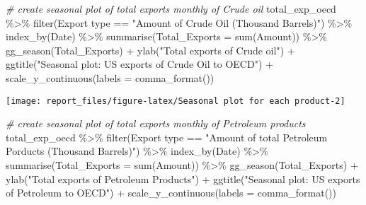 \documentclass[
]{article}
\newenvironment{Shaded}{\begin{snugshade}}{\end{snugshade}}
\newcommand{\AttributeTok}[1]{\textcolor[rgb]{0.77,0.63,0.00}{#1}}
\newcommand{\CommentTok}[1]{\textcolor[rgb]{0.56,0.35,0.01}{\textit{#1}}}
\newcommand{\FunctionTok}[1]{\textcolor[rgb]{0.00,0.00,0.00}{#1}}
\newcommand{\NormalTok}[1]{#1}
\newcommand{\SpecialCharTok}[1]{\textcolor[rgb]{0.00,0.00,0.00}{#1}}
\newcommand{\StringTok}[1]{\textcolor[rgb]{0.31,0.60,0.02}{#1}}
\begin{document}
\begin{Shaded}
\begin{Highlighting}[]
\CommentTok{\# create seasonal plot of total exports monthly of Crude oil}
\NormalTok{total\_exp\_oecd }\SpecialCharTok{\%\textgreater{}\%} \FunctionTok{filter}\NormalTok{(}\StringTok{\textasciigrave{}}\AttributeTok{Export type}\StringTok{\textasciigrave{}} \SpecialCharTok{==} \StringTok{"Amount of Crude Oil (Thousand Barrels)"}\NormalTok{) }\SpecialCharTok{\%\textgreater{}\%} 
  \FunctionTok{index\_by}\NormalTok{(Date) }\SpecialCharTok{\%\textgreater{}\%} 
  \FunctionTok{summarise}\NormalTok{(}\AttributeTok{Total\_Exports =} \FunctionTok{sum}\NormalTok{(}\StringTok{\textasciigrave{}}\AttributeTok{Amount}\StringTok{\textasciigrave{}}\NormalTok{)) }\SpecialCharTok{\%\textgreater{}\%} 
  \FunctionTok{gg\_season}\NormalTok{(Total\_Exports) }\SpecialCharTok{+}
  \FunctionTok{ylab}\NormalTok{(}\StringTok{"Total exports  of Crude oil"}\NormalTok{) }\SpecialCharTok{+}
  \FunctionTok{ggtitle}\NormalTok{(}\StringTok{"Seasonal plot: US exports of Crude Oil to OECD"}\NormalTok{) }\SpecialCharTok{+}
  \FunctionTok{scale\_y\_continuous}\NormalTok{(}\AttributeTok{labels =} \FunctionTok{comma\_format}\NormalTok{())}
\end{Highlighting}
\end{Shaded}

\begin{center}\texttt{[image: report\_files/figure-latex/Seasonal plot for each product-2]} \end{center}

\begin{Shaded}
\begin{Highlighting}[]
\CommentTok{\# create seasonal plot of total exports monthly of Petroleum products}
\NormalTok{total\_exp\_oecd }\SpecialCharTok{\%\textgreater{}\%} \FunctionTok{filter}\NormalTok{(}\StringTok{\textasciigrave{}}\AttributeTok{Export type}\StringTok{\textasciigrave{}} \SpecialCharTok{==} \StringTok{"Amount of total Petroleum Porducts (Thousand Barrels)"}\NormalTok{) }\SpecialCharTok{\%\textgreater{}\%} 
  \FunctionTok{index\_by}\NormalTok{(Date) }\SpecialCharTok{\%\textgreater{}\%} 
  \FunctionTok{summarise}\NormalTok{(}\AttributeTok{Total\_Exports =} \FunctionTok{sum}\NormalTok{(}\StringTok{\textasciigrave{}}\AttributeTok{Amount}\StringTok{\textasciigrave{}}\NormalTok{)) }\SpecialCharTok{\%\textgreater{}\%} 
  \FunctionTok{gg\_season}\NormalTok{(Total\_Exports) }\SpecialCharTok{+}
  \FunctionTok{ylab}\NormalTok{(}\StringTok{"Total exports  of Petroleum Products"}\NormalTok{) }\SpecialCharTok{+}
  \FunctionTok{ggtitle}\NormalTok{(}\StringTok{"Seasonal plot: US exports of Petroleum to OECD"}\NormalTok{) }\SpecialCharTok{+}
  \FunctionTok{scale\_y\_continuous}\NormalTok{(}\AttributeTok{labels =} \FunctionTok{comma\_format}\NormalTok{())}
\end{Highlighting}
\end{Shaded}
\end{document}

